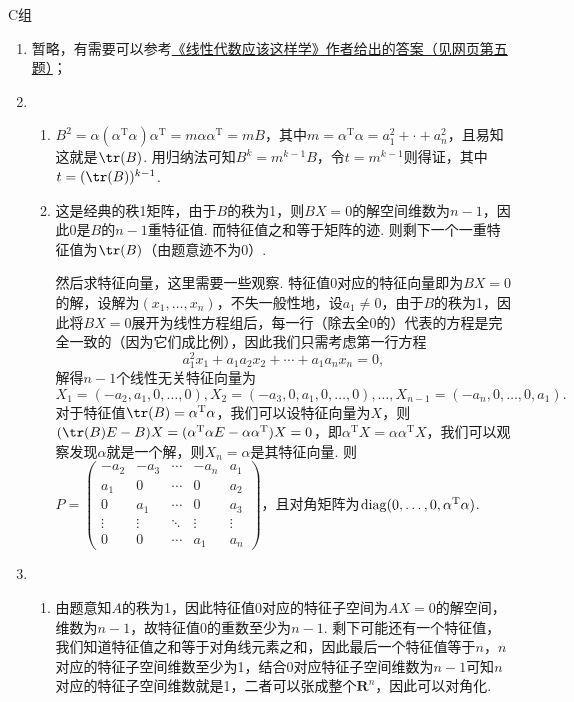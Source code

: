 \centerline{\heiti C组}
\begin{enumerate}
    \item 暂略，有需要可以参考\href{https://linearalgebras.com/5c.html}{《线性代数应该这样学》作者给出的答案（见网页第五题）}；

    \item \begin{enumerate}
              \item $B^2=\alpha(\alpha^\mathrm{T}\alpha)\alpha^\mathrm{T}=m\alpha\alpha^\mathrm{T}=mB$，其中$m=\alpha^\mathrm{T}\alpha=a_1^2+\cdot+a_n^2$，且易知这就是$\tr(B)$. 用归纳法可知$B^k=m^{k-1}B$，令$t=m^{k-1}$则得证，其中$t=(\tr(B))^{k-1}$.

              \item 这是经典的秩1矩阵，由于$B$的秩为1，则$BX=0$的解空间维数为$n-1$，因此0是$B$的$n-1$重特征值. 而特征值之和等于矩阵的迹. 则剩下一个一重特征值为$\tr(B)$（由题意迹不为0）.

                    然后求特征向量，这里需要一些观察. 特征值0对应的特征向量即为$BX=0$的解，设解为$(x_1,\ldots,x_n)$，不失一般性地，设$a_1\neq 0$，由于$B$的秩为1，因此将$BX=0$展开为线性方程组后，每一行（除去全0的）代表的方程是完全一致的（因为它们成比例），因此我们只需考虑第一行方程
                    \[a_1^2x_1+a_1a_2x_2+\cdots+a_1a_nx_n=0,\]
                    解得$n-1$个线性无关特征向量为
                    \[X_1=(-a_2,a_1,0,\ldots,0),X_2=(-a_3,0,a_1,0,\ldots,0),\ldots,X_{n-1}=(-a_n,0,\ldots,0,a_1).\]
                    对于特征值$\tr(B)=\alpha^\mathrm{T}\alpha$，我们可以设特征向量为$X$，则$(\tr(B)E-B)X=(\alpha^\mathrm{T}\alpha E-\alpha\alpha^\mathrm{T})X=0$，即$\alpha^\mathrm{T}X=\alpha\alpha^\mathrm{T}X$，我们可以观察发现$\alpha$就是一个解，则$X_n=\alpha$是其特征向量. 则$P=\begin{pmatrix}
                            -a_2 & -a_3 & \cdots & -a_n & a_1 \\ a_1 & 0 & \cdots & 0 & a_2 \\ 0 & a_1 & \cdots & 0 & a_3 \\ \vdots & \vdots & \ddots & \vdots & \vdots \\ 0 & 0 & \cdots & a_1 & a_n
                        \end{pmatrix}$，且对角矩阵为$\operatorname{diag}(0,\ldots,0,\alpha^\mathrm{T}\alpha)$.
          \end{enumerate}

    \item \begin{enumerate}
              \item 由题意知$A$的秩为1，因此特征值0对应的特征子空间为$AX=0$的解空间，维数为$n-1$，故特征值0的重数至少为$n-1$. 剩下可能还有一个特征值，我们知道特征值之和等于对角线元素之和，因此最后一个特征值等于$n$，$n$对应的特征子空间维数至少为1，结合0对应特征子空间维数为$n-1$可知$n$对应的特征子空间维数就是1，二者可以张成整个$\mathbf{R}^n$，因此可以对角化.


\end{enumerate}
\end{enumerate}
